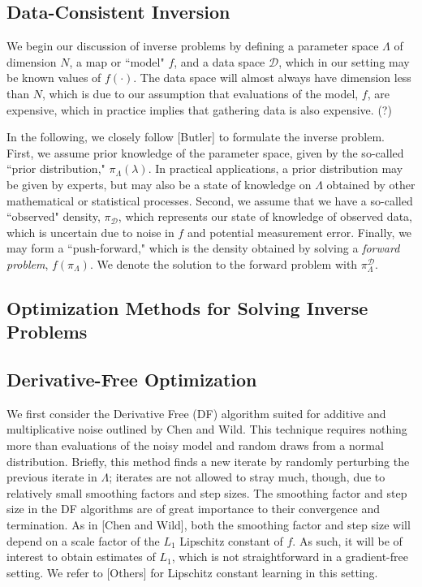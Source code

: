 \documentclass{report}
\begin{document}
\subsection{Data-Consistent Inversion}

We begin our discussion of inverse problems by defining a parameter space $\Lambda$ of dimension $N$, a map or ``model" $f$, and a data space $\mathcal{D}$, which in our setting may be known values of $f(\cdot)$. The data space will almost always have dimension less than $N$, which is due to our assumption that evaluations of the model, $f$, are expensive, which in practice implies that gathering data is also expensive. (?) 

\vspace{.25cm}

\noindent In the following, we closely follow [Butler] to formulate the inverse problem. First, we assume prior knowledge of the parameter space, given by the so-called ``prior distribution," $\pi_\Lambda(\lambda)$. In practical applications, a prior distribution may be given by experts, but may also be a state of knowledge on $\Lambda$ obtained by other mathematical or statistical processes. Second, we assume that we have a so-called ``observed" density, $\pi_\mathcal{D}$, which represents our state of knowledge of observed data, which is uncertain due to noise in $f$ and potential measurement error. Finally, we may form a ``push-forward," which is the density obtained by solving a \textit{forward problem}, $f\left(\pi_\Lambda \right)$. We denote the solution to the forward problem with $\pi_\Lambda^\mathcal{D}$.

\subsection{Optimization Methods for Solving Inverse Problems}

\subsection{Derivative-Free Optimization}

We first consider the Derivative Free (DF) algorithm suited for additive and multiplicative noise outlined by Chen and Wild. This technique requires nothing more than evaluations of the noisy model and random draws from a normal distribution. Briefly, this method finds a new iterate by randomly perturbing the previous iterate in $\Lambda$; iterates are not allowed to stray much, though, due to relatively small smoothing factors and step sizes. The smoothing factor and step size in the DF algorithms are of great importance to their convergence and termination. As in [Chen and Wild], both the smoothing factor and step size will depend on a scale factor of the $L_1$ Lipschitz constant of $f$. As such, it will be of interest to obtain estimates of $L_1$, which is not straightforward in a gradient-free setting. We refer to [Others] for Lipschitz constant learning in this setting. 
\end{document}
